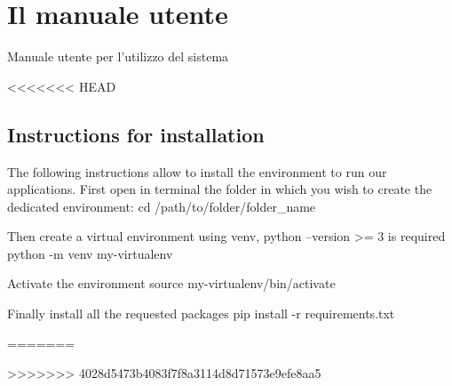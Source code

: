 \chapter{Il manuale utente}
\label{appendiceD}
\thispagestyle{empty}

\noindent Manuale utente per l'utilizzo del sistema

<<<<<<< HEAD
\section{Instructions for installation}

The following instructions allow to install the environment to run our applications. 
First open in terminal the folder in which you wish to create the dedicated environment:
cd /path/to/folder/folder_name

Then create a virtual environment using venv, python --version >= 3 is required
python -m venv my-virtualenv

Activate the environment
source my-virtualenv/bin/activate

Finally  install all the requested packages 
pip install -r requirements.txt

=======


\usepackage{color}
>>>>>>> 4028d5473b4083f7f8a3114d8d71573e9efe8aa5
